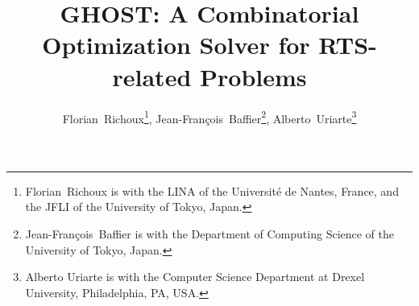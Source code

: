 \documentclass[journal]{IEEEtran}
\newcommand{\ghost}{\textsc{GHOST}\xspace}
\begin{document}


%
\title{\ghost: A Combinatorial Optimization Solver for RTS-related Problems}
%
%
%


\author{Florian~Richoux\thanks{Florian~Richoux is with the LINA of the Universit{\'e} de Nantes, France, and the JFLI of the University of Tokyo, Japan.},
        Jean-Fran{\c c}ois~Baffier\thanks{Jean-Fran{\c c}ois~Baffier is with the Department of Computing Science of the University of Tokyo, Japan.},
        Alberto~Uriarte\thanks{Alberto Uriarte is with the Computer Science Department at Drexel University, Philadelphia, PA, USA.}}



% 
%
\end{document}
